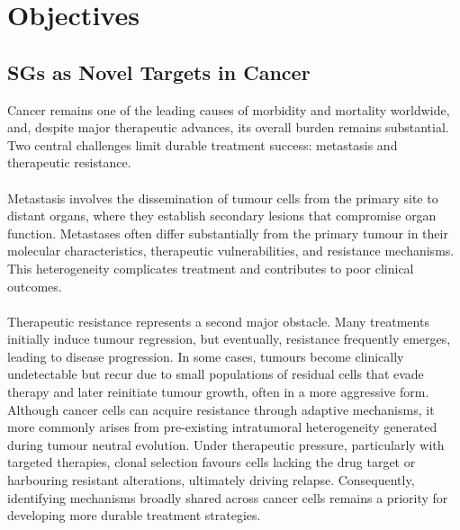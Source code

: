 \chapter{Objectives}

\section{SGs as Novel Targets in Cancer}

Cancer remains one of the leading causes of morbidity and mortality worldwide\cite{bray_global_2024}, and, despite major therapeutic advances, its overall burden remains substantial\cite{bray_global_2024}. Two central challenges limit durable treatment success: metastasis and therapeutic resistance\cite{weiss_towards_2022}.
\\
\\
Metastasis involves the dissemination of tumour cells from the primary site to distant organs, where they establish secondary lesions that compromise organ function\cite{weiss_towards_2022}. Metastases often differ substantially from the primary tumour in their molecular characteristics, therapeutic vulnerabilities, and resistance mechanisms\cite{weiss_towards_2022}. This heterogeneity complicates treatment and contributes to poor clinical outcomes\cite{weiss_towards_2022}.
\\
\\
Therapeutic resistance represents a second major obstacle. Many treatments initially induce tumour regression, but eventually, resistance frequently emerges, leading to disease progression\cite{weiss_towards_2022}. In some cases, tumours become clinically undetectable but recur due to small populations of residual cells that evade therapy and later reinitiate tumour growth, often in a more aggressive form\cite{ramos_mechanism-based_2015}. Although cancer cells can acquire resistance through adaptive mechanisms\cite{ramos_mechanism-based_2015}, it more commonly arises from pre-existing intratumoral heterogeneity generated during tumour neutral evolution\cite{ramos_mechanism-based_2015, williams_identification_2016}. Under therapeutic pressure, particularly with targeted therapies, clonal selection favours cells lacking the drug target or harbouring resistant alterations, ultimately driving relapse\cite{ramos_mechanism-based_2015, williams_identification_2016}. Consequently, identifying mechanisms broadly shared across cancer cells remains a priority for developing more durable treatment strategies\cite{ramos_mechanism-based_2015}.
